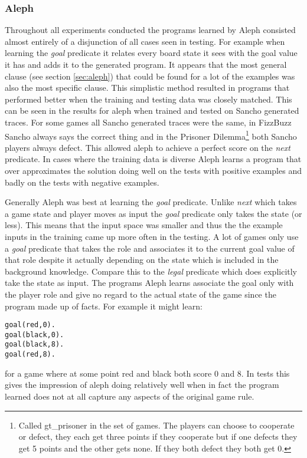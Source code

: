 \subsubsection{Aleph}
Throughout all experiments conducted the programs learned by Aleph consisted almost entirely of a disjunction of all cases seen in testing. For example when learning the \textit{goal} predicate it relates every board state it sees with the goal value it has and adds it to the generated program. It appears that the most general clause (see section \ref{sec:aleph}) that could be found for a lot of the examples was also the most specific clause. This simplistic method resulted in programs that performed better when the training and testing data was closely matched. This can be seen in the results for aleph when trained and tested on Sancho generated traces. For some games all Sancho generated traces were the same, in FizzBuzz Sancho always says the correct thing and in the Prisoner Dilemma\footnote{Called gt\_prisoner in the set of games. The players can choose to cooperate or defect, they each get three points if they cooperate but if one defects they get 5 points and the other gets none. If they both defect they both get 0.} both Sancho players always defect. This allowed aleph to achieve a perfect score on the \textit{next} predicate. In cases where the training data is diverse Aleph learns a program that over approximates the solution doing well on the tests with positive examples and badly on the tests with negative examples.

Generally Aleph was best at learning the \textit{goal} predicate. Unlike \textit{next} which takes a game state and player moves as input the \textit{goal} predicate only takes the state (or less). This means that the input space was smaller and thus the the example inputs in the training came up more often in the testing. A lot of games only use a \textit{goal} predicate that takes the role and associates it to the current goal value of that role despite it actually depending on the state which is included in the background knowledge. Compare this to the \textit{legal} predicate which does explicitly take the state as input. The programs Aleph learns associate the goal only with the player role and give no regard to the actual state of the game since the program made up of facts. For example it might learn:
\begin{verbatim}
goal(red,0).
goal(black,0).
goal(black,8).
goal(red,8).
\end{verbatim}
for a game where at some point red and black both score 0 and 8. In tests this gives the impression of aleph doing relatively well when in fact the program learned does not at all capture any aspects of the original game rule.

